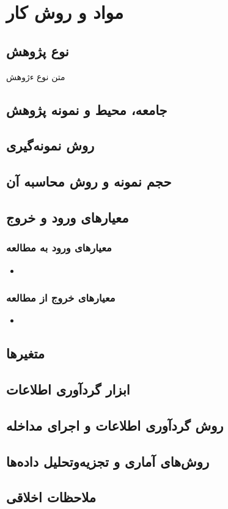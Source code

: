 
\chapter{مواد و روش کار}
\section{نوع پژوهش}
متن نوع ءژوهش
\section{جامعه، محیط و نمونه پژوهش}

\section{روش نمونه‌گیری}

\section{حجم نمونه و روش محاسبه آن}

\section{معیارهای ورود و خروج}
\subsection{معیارهای ورود به مطالعه}
\begin{itemize}
  \item
\end{itemize}

\subsection{معیارهای خروج از مطالعه}
\begin{itemize}
  \item
\end{itemize}

\section{متغیرها}


\section{ابزار گردآوری اطلاعات}

\section{روش گردآوری اطلاعات و اجرای مداخله}

\section{روش‌های آماری و تجزیه‌وتحلیل داده‌ها}

\section{ملاحظات اخلاقی}

\clearpage
